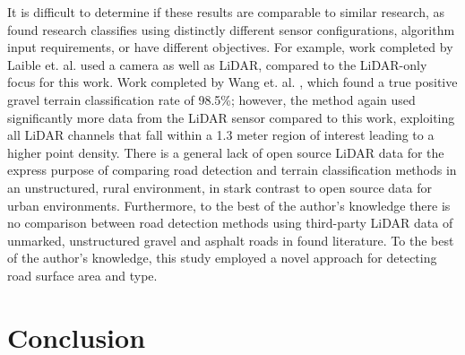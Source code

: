 \documentclass[journal,onecolumn]{IEEEtran}
\begin{document}
		{It is difficult to determine if these results are comparable to similar research, as found research classifies using distinctly different sensor configurations,  algorithm input requirements, or have different objectives. For example, work completed by Laible et. al. \cite{levi_3d_2012_light} used a camera as well as LiDAR, compared to the LiDAR-only focus for this work. Work completed by Wang et. al. \cite{wang_road_nodate}, which found a true positive gravel terrain classification rate of 98.5\%; however, the method again used significantly more data from the LiDAR sensor compared to this work, exploiting all LiDAR channels that fall within a 1.3 meter region of interest leading to a higher point density. There is a general lack of open source LiDAR data for the express purpose of comparing road detection and terrain classification methods in an unstructured, rural environment, in stark contrast to open source data for urban environments. Furthermore, to the best of the author's knowledge there is no comparison between road detection methods using third-party LiDAR data of unmarked, unstructured gravel and asphalt roads in found literature. To the best of the author's knowledge, this study employed a novel approach for detecting road surface area and type.}
		


	
	
	\section{Conclusion}
	
\end{document}
